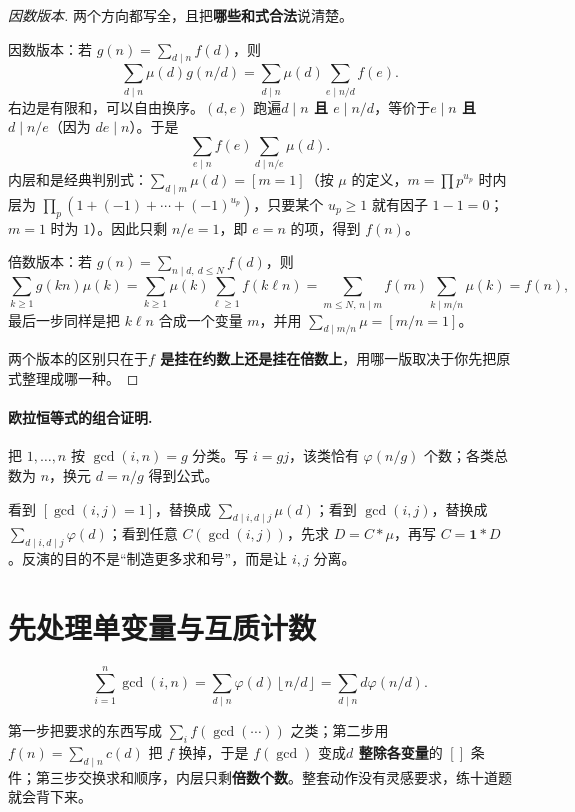 \documentclass[UTF8,a4paper,11pt,twoside,openright,fontset=fandol]{ctexbook}
\theoremstyle{definition}
\newcommand{\one}{\mathbf 1}
\newcommand{\floor}[1]{\left\lfloor #1\right\rfloor}
\newcommand{\iva}[1]{\left[#1\right]}
\begin{document}
\begin{proof}[因数版本]
两个方向都写全，且把\textbf{哪些和式合法}说清楚。

因数版本：若 $g(n)=\sum_{d\mid n}f(d)$，则
\[
 \sum_{d\mid n}\mu(d)g(n/d)
 =\sum_{d\mid n}\mu(d)\sum_{e\mid n/d}f(e).
\]
右边是有限和，可以自由换序。$(d,e)$ 跑遍\textbf{$d\mid n$ 且 $e\mid n/d$}，等价于\textbf{$e\mid n$ 且 $d\mid n/e$}（因为 $de\mid n$）。于是
\[
 \sum_{e\mid n}f(e)\sum_{d\mid n/e}\mu(d).
\]
内层和是经典判别式：$\sum_{d\mid m}\mu(d)=\iva{m=1}$（按 $\mu$ 的定义，$m=\prod p^{u_p}$ 时内层为 $\prod_p(1+(-1)+\cdots+(-1)^{u_p})$，只要某个 $u_p\ge1$ 就有因子 $1-1=0$；$m=1$ 时为 $1$）。因此只剩 $n/e=1$，即 $e=n$ 的项，得到 $f(n)$。

倍数版本：若 $g(n)=\sum_{n\mid d,\ d\le N}f(d)$，则
\[
 \sum_{k\ge1}g(kn)\mu(k)=\sum_{k\ge1}\mu(k)\sum_{\ell\ge1}f(k\ell n)
 =\sum_{m\le N,\,n\mid m}f(m)\!\!\sum_{k\mid m/n}\!\!\mu(k)=f(n),
\]
最后一步同样是把 $k\ell n$ 合成一个变量 $m$，并用 $\sum_{d\mid m/n}\mu=\iva{m/n=1}$。

两个版本的区别只在于\textbf{$f$ 是挂在约数上还是挂在倍数上}，用哪一版取决于你先把原式整理成哪一种。
\end{proof}
\paragraph{欧拉恒等式的组合证明.}
把 $1,\ldots,n$ 按 $\gcd(i,n)=g$ 分类。写 $i=gj$，该类恰有 $\varphi(n/g)$ 个数；各类总数为 $n$，换元 $d=n/g$ 得到公式。
\begin{teach}[怎样想到反演？]
看到 $[\gcd(i,j)=1]$，替换成 $\sum_{d\mid i,d\mid j}\mu(d)$；看到 $\gcd(i,j)$，替换成 $\sum_{d\mid i,d\mid j}\varphi(d)$；看到任意 $C(\gcd(i,j))$，先求 $D=C*\mu$，再写 $C=\one*D$。反演的目的不是“制造更多求和号”，而是让 $i,j$ 分离。
\end{teach}


\section{先处理单变量与互质计数}
\[
 \sum_{i=1}^n\gcd(i,n)
 =\sum_{d\mid n}\varphi(d)\floor{n/d}
 =\sum_{d\mid n}d\varphi(n/d).
\]

\begin{tip}
第一步把要求的东西写成 $\sum_{i}f(\gcd(\cdots))$ 之类；第二步用 $f(n)=\sum_{d\mid n}c(d)$ 把 $f$ 换掉，于是 $f(\gcd)$ 变成\textbf{$d$ 整除各变量}的 $\iva{}$ 条件；第三步交换求和顺序，内层只剩\textbf{倍数个数}。整套动作没有灵感要求，练十道题就会背下来。
\end{tip}
\end{document}
